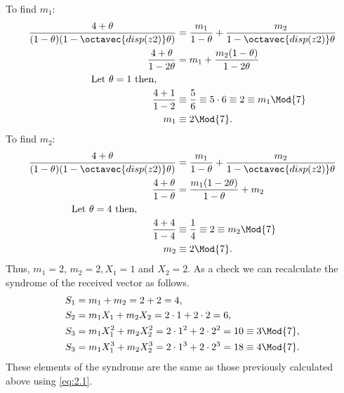 To find $m_1$:
\begin{align*}
	\frac{4 + \theta}{(1-\theta)(1-\octavec{disp(z2)}\theta)} &= \frac{m_1}{1-\theta} + \frac{m_2}{1-\octavec{disp(z2)}\theta}\\
	\frac{4 + \theta}{1-2\theta} &= m_1 + \frac{m_2(1-\theta)}{1-2\theta}\\
	\textrm{Let  $\theta = 1$ then},\quad\quad&\\
	\frac{4 + 1}{1 - 2} &\equiv \frac{5}{6} \equiv 5\cdot 6 \equiv 2 \equiv m_1 \Mod{7}\\
	m_1 &\equiv 2\Mod{7}.
\end{align*}
To find $m_2$:
\begin{align*}
	\frac{4 + \theta}{(1-\theta)(1-\octavec{disp(z2)}\theta)} &= \frac{m_1}{1-\theta} +
	\frac{m_2}{1-\octavec{disp(z2)}\theta}\\
	\frac{4 + \theta}{1-\theta} &=  \frac{m_1(1-2\theta)}{1-\theta} + m_2\\
	\textrm{Let  $\theta = 4$ then},\qquad\qquad&\\
	\frac{4 + 4}{1 - 4} &\equiv \frac{1}{4} \equiv 2 \equiv m_2 \Mod{7}\\
	m_2 &\equiv 2\Mod{7}.
\end{align*}
Thus, $m_1=2$, $m_2=2, X_1=1$ and $X_2=2$. As a check we can recalculate the syndrome of the received vector as follows.
\begin{align*}
	S_1 &= m_1 + m_2 = 2 + 2 = 4,\\
	S_2 &= m_1X_1 + m_2X_2 = 2\cdot1+ 2\cdot2 = 6,\\
	S_3 &= m_1X_1^2 + m_2X_2^2 = 2\cdot1^2+ 2\cdot2^2 = 10 \equiv 3 \Mod{7},\\
	S_3 &= m_1X_1^3 + m_2X_2^3 = 2\cdot1^3+ 2\cdot2^3 = 18 \equiv 4 \Mod{7}.\\
\end{align*}
These elements of the syndrome are the same as those previously calculated above using \eqref{eq:2.1}. 

